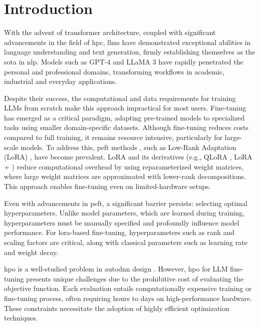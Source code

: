 \section{Introduction}
\label{sec:intro}

With the advent of transformer architecture\cite{vaswani_attention_2017}, coupled with significant advancements in the field of \acrfull{hpc}, \acrfull{llm}s have demonstrated exceptional abilities in language understanding and text generation, firmly establishing themselves as the \acrfull{sota} in \acrfull{nlp}. Models such as GPT-4 \cite{openai_gpt-4_2024} and LLaMA 3 \cite{grattafiori_llama_2024} have rapidly penetrated the personal and professional domains, transforming workflows in academic, industrial and everyday applications.

Despite their success, the computational and data requirements for training LLMs from scratch make this approach impractical for most users. Fine-tuning has emerged as a critical paradigm, adapting pre-trained models to specialized tasks using smaller domain-specific datasets. Although fine-tuning reduces costs compared to full training, it remains resource intensive, particularly for large-scale models. To address this, \acrfull{peft} methods \cite{han_parameter-efficient_2024}, such as Low-Rank Adaptation (LoRA) \cite{hu_lora_2021}, have become prevalent. LoRA and its derivatives (e.g., QLoRA \cite{dettmers_qlora_2023}, LoRA + \cite{hayou_lora_2024}) reduce computational overhead by using reparameterized weight matrices, where large weight matrices are approximated with lower-rank decompositions. This approach enables fine-tuning even on limited-hardware setups.

Even with advancements in \acrshort{peft}, a significant barrier persists: selecting optimal hyperparameters. Unlike model parameters, which are learned during training, hyperparameters must be manually specified and profoundly influence model performance. For \acrshort{lora}-based fine-tuning, hyperparameters such as rank and scaling factors are critical\cite{valipour_dylora_2023}, along with classical parameters such as learning rate and weight decay.

\acrfull{hpo} is a well-studied problem \cite{bischl_hyperparameter_2021,bergstra_algorithms_2011,feurer_hyperparameter_2019} in \acrfull{autodnn} design \cite{talbi_automated_2021}. However, \acrshort{hpo} for LLM fine-tuning presents unique challenges due to the prohibitive cost of evaluating the objective function. Each evaluation entails computationally expensive training or fine-tuning process, often requiring hours to days on high-performance hardware. These constraints necessitate the adoption of highly efficient optimization techniques.


